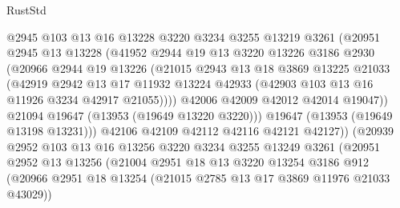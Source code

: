 \begin{lexlean}{RustStd}
\begin{coremodule}
                        @2945
                        @103
                        @13
                        @16
                        @13228
                        @3220
                        @3234
                        @3255
                        @13219
                        @3261
                        (@20951
                          @2945
                          @13
                          @13228
                          (@41952
                            @2944
                            @19
                            @13
                            @3220
                            @13226
                            @3186
                            @2930
                            (@20966
                              @2944
                              @19
                              @13226
                              (@21015
                                @2943
                                @13
                                @18
                                @3869
                                @13225
                                @21033
                                (@42919
                                  @2942
                                  @13
                                  @17
                                  @11932
                                  @13224
                                  @42933
                                  (@42903 @103 @13 @16 @11926 @3234 @42917 @21055))))
                            @42006
                            @42009
                            @42012
                            @42014
                            @19047))
                        @21094
                        @19647
                        (@13953 (@19649 @13220 @3220)))
                      @19647
                      (@13953 (@19649 @13198 @13231)))
                    @42106
                    @42109
                    @42112
                    @42116
                    @42121
                    @42127))
                (@20939
                  @2952
                  @103
                  @13
                  @16
                  @13256
                  @3220
                  @3234
                  @3255
                  @13249
                  @3261
                  (@20951
                    @2952
                    @13
                    @13256
                    (@21004
                      @2951
                      @18
                      @13
                      @3220
                      @13254
                      @3186
                      @912
                      (@20966 @2951 @18 @13254 (@21015 @2785 @13 @17 @3869 @11976 @21033 @43029))

\end{coremodule}
\end{lexlean}
